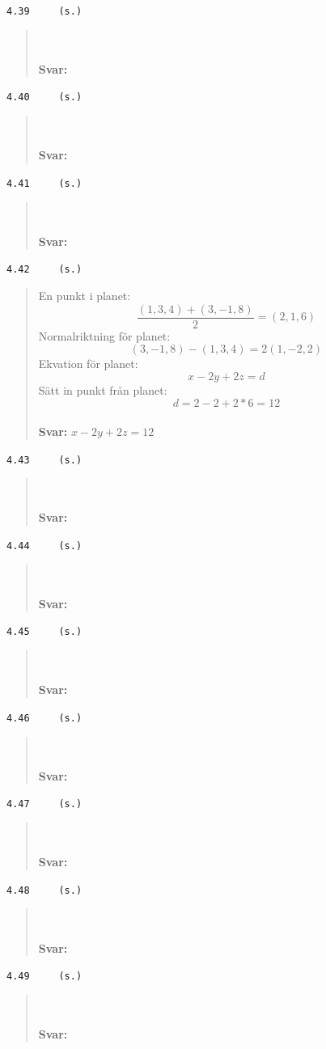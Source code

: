 \documentclass[a4paper]{article}
\newcommand{\tskcol}[1]{\textcolor{tskcol}{#1}}
\begin{document}
\texttt{\tskcol{4.39~~~~ (s.)}}
\begin{quotation}
	\noindent
	\\ \\
	\textbf{Svar:}
\end{quotation}

\texttt{\tskcol{4.40~~~~ (s.)}}
\begin{quotation}
	\noindent
	\\ \\
	\textbf{Svar:}
\end{quotation}

\texttt{\tskcol{4.41~~~~ (s.)}}
\begin{quotation}
	\noindent
	\\ \\
	\textbf{Svar:}
\end{quotation}

\texttt{\tskcol{4.42~~~~ (s.)}}
\begin{quotation}
	\noindent
	En punkt i planet:
	\[\frac{(1,3,4)+(3,-1,8)}{2}=(2,1,6)\]
	Normalriktning för planet:
	\[(3,-1,8)-(1,3,4)=2(1,-2,2)\]
	Ekvation för planet:
	\[x-2y+2z=d\]
	Sätt in punkt från planet:
	\[d=2-2+2*6=12\]
	\\
	\textbf{Svar:} $x-2y+2z=12$
\end{quotation}

\texttt{\tskcol{4.43~~~~ (s.)}}
\begin{quotation}
	\noindent
	\\ \\
	\textbf{Svar:}
\end{quotation}

\texttt{\tskcol{4.44~~~~ (s.)}}
\begin{quotation}
	\noindent
	\\ \\
	\textbf{Svar:}
\end{quotation}

\texttt{\tskcol{4.45~~~~ (s.)}}
\begin{quotation}
	\noindent
	\\ \\
	\textbf{Svar:}
\end{quotation}

\texttt{\tskcol{4.46~~~~ (s.)}}
\begin{quotation}
	\noindent
	\\ \\
	\textbf{Svar:}
\end{quotation}

\texttt{\tskcol{4.47~~~~ (s.)}}
\begin{quotation}
	\noindent
	\\ \\
	\textbf{Svar:}
\end{quotation}

\texttt{\tskcol{4.48~~~~ (s.)}}
\begin{quotation}
	\noindent
	\\ \\
	\textbf{Svar:}
\end{quotation}

\texttt{\tskcol{4.49~~~~ (s.)}}
\begin{quotation}
	\noindent
	\\ \\
	\textbf{Svar:}
\end{quotation}
\end{document}
